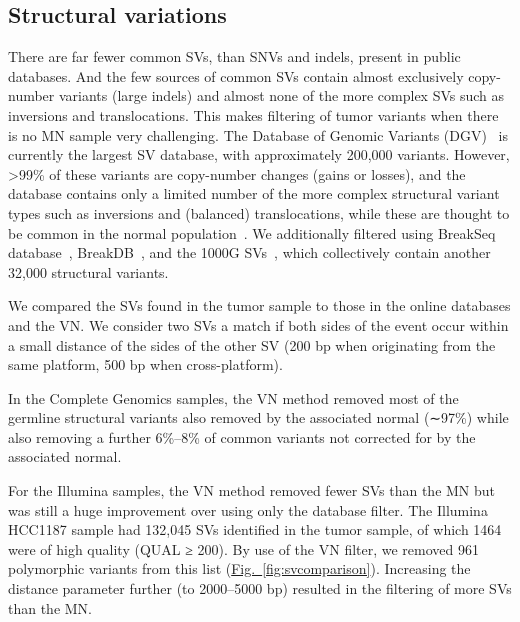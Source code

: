 \subsection*{Structural variations}

There are far fewer common SVs, than SNVs and indels, present in public databases. And the few sources of common SVs contain almost exclusively copy-number variants (large indels) and almost none of the more complex SVs such as inversions and translocations. This makes filtering of tumor variants when there is no MN sample very challenging. The Database of Genomic Variants (DGV)~\cite{macdonald2013database} is currently the largest SV database, with approximately 200,000 variants. However, >99\% of these variants are copy-number changes (gains or losses), and the database contains only a limited number of the more complex structural variant types such as inversions and (balanced) translocations, while these are thought to be common in the normal population~\cite{feuk2006structural,10002010map,10002012integrated,mills2011mapping}. We additionally filtered using BreakSeq database~\cite{lam2010nucleotide}, BreakDB~\cite{korbel2009pemer}, and the 1000G SVs~\cite{10002010map,10002012integrated}, which collectively contain another 32,000 structural variants.

We compared the SVs found in the tumor sample to those in the online databases and the VN\@. We consider two SVs a match if both sides of the event occur within a small distance of the sides of the other SV (200 bp when originating from the same platform, 500 bp when cross-platform).

In the Complete Genomics samples, the VN method removed most of the germline structural variants also removed by the associated normal (∼97\%) while also removing a further 6\%–8\% of common variants not corrected for by the associated normal.

For the Illumina samples, the VN method removed fewer SVs than the MN but was still a huge improvement over using only the database filter. The Illumina HCC1187 sample had 132,045 SVs identified in the tumor sample, of which 1464 were of high quality (QUAL ≥ 200). By use of the VN filter, we removed 961 polymorphic variants from this list (\hyperref[fig:svcomparison]{Fig.~\ref{fig:svcomparison}}). Increasing the distance parameter further (to 2000–5000 bp) resulted in the filtering of more SVs than the MN.

